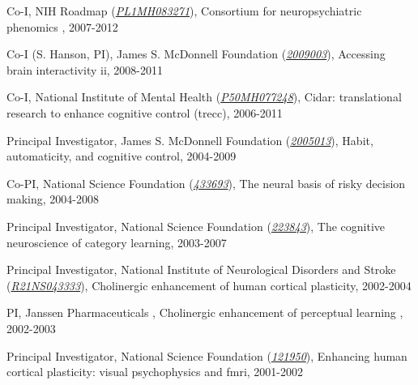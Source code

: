 \documentclass[10pt, letterpaper]{article}
\begin{document}
Co-I, NIH Roadmap  (\href{https://projectreporter.nih.gov/project_info_description.cfm?aid=7650594}{\textit{PL1MH083271}}), Consortium for neuropsychiatric phenomics , 2007-2012\vspace{2mm}

Co-I (S. Hanson, PI), James S. McDonnell Foundation  (\href{https://www.jsmf.org/grants/2009003/}{\textit{2009003}}), Accessing brain interactivity ii, 2008-2011\vspace{2mm}

Co-I, National Institute of Mental Health  (\href{https://projectreporter.nih.gov/project_info_description.cfm?aid=7480935}{\textit{P50MH077248}}), Cidar: translational research to enhance cognitive control (trecc), 2006-2011\vspace{2mm}

Principal Investigator, James S. McDonnell Foundation  (\href{https://www.jsmf.org/grants/2005013/}{\textit{2005013}}), Habit, automaticity, and cognitive control, 2004-2009\vspace{2mm}

Co-PI, National Science Foundation  (\href{http://grants.uberresearch.com/100000001/0433693/The-Neural-Basis-of-Risky-Decision-Making}{\textit{433693}}), The neural basis of risky decision making, 2004-2008\vspace{2mm}

Principal Investigator, National Science Foundation  (\href{http://grants.uberresearch.com/100000001/0223843/COLLABORATIVE-RESEARCH-The-Cognitive-Neuroscience-of-Category-Learning}{\textit{223843}}), The cognitive neuroscience of category learning, 2003-2007\vspace{2mm}

Principal Investigator, National Institute of Neurological Disorders and Stroke  (\href{http://projectreporter.nih.gov/project_info_description.cfm?aid=6623403}{\textit{R21NS043333}}), Cholinergic enhancement of human cortical plasticity, 2002-2004\vspace{2mm}

PI, Janssen Pharmaceuticals , Cholinergic enhancement of perceptual learning , 2002-2003\vspace{2mm}

Principal Investigator, National Science Foundation  (\href{http://grants.uberresearch.com/100000001/0121950/Enhancing-Human-Cortical-Plasticity-Visual-Psychophysics-and-fMRI}{\textit{121950}}), Enhancing human cortical plasticity: visual psychophysics and fmri, 2001-2002\vspace{2mm}
\end{document}
